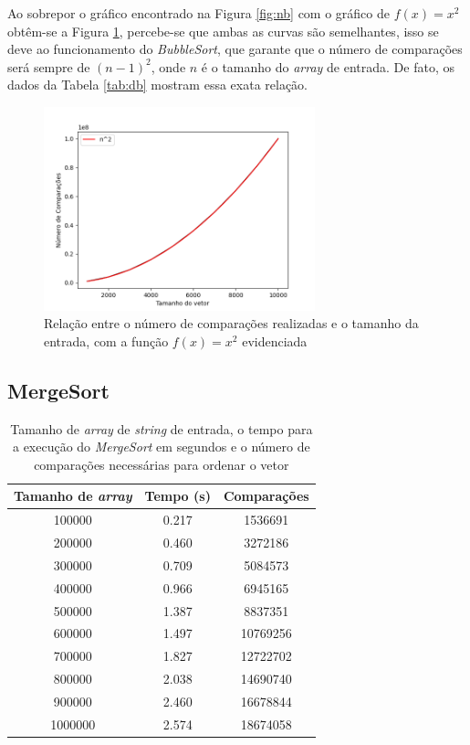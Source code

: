 \documentclass[12pt,a4paper,oneside]{article}
\begin{document}
\quad Ao sobrepor o gráfico encontrado na Figura \ref{fig:nb} com o gráfico de $f(x)=x^2$ obtêm-se a Figura \ref{fig:bOK}, percebe-se que ambas as curvas são semelhantes, isso se deve ao funcionamento do \textit{BubbleSort}, que garante que o número de comparações será sempre de $(n-1)^2$, onde $n$ é o tamanho do \textit{array} de entrada. De fato, os dados da Tabela \ref{tab:db} mostram essa exata relação.

\begin{figure}[H]
\begin{center}
    \includegraphics[width=0.7\textwidth]{FigBn2.png} 
\end{center}
\caption{Relação entre o número de comparações realizadas e o tamanho da entrada, com a função $f(x)=x^2$ evidenciada}
\label{fig:bOK}
\end{figure}

\subsection{MergeSort}

\begin{table}[H]
\caption{Tamanho de \textit{array} de \textit{string} de entrada, o tempo para a execução do \textit{MergeSort} em segundos e o número de comparações necessárias para ordenar o vetor}
\label{tab:dm}
\begin{center}
\begin{tabular}{|c c c|}
\hline
Tamanho de \textit{array}	& Tempo (s)	& Comparações 	\\
\hline
100000 & 0.217 & 1536691\\
200000 & 0.460 & 3272186\\
300000 & 0.709 & 5084573\\
400000 & 0.966 & 6945165\\
500000 & 1.387 & 8837351\\
600000 & 1.497 & 10769256\\
700000 & 1.827 & 12722702\\
800000 & 2.038 & 14690740\\
900000 & 2.460 & 16678844\\
1000000 & 2.574 & 18674058\\
\hline
\end{tabular}
\end{center}
\end{table}
\end{document}
